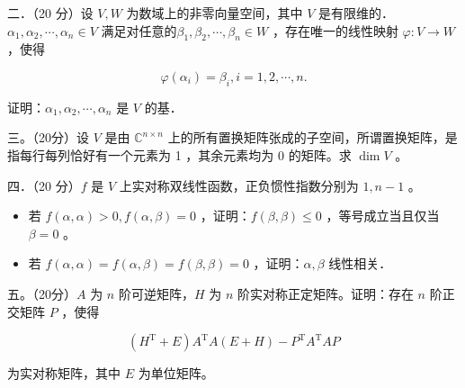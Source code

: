 \documentclass{article}
\begin{document}
二．（20 分）设 \(V, W\) 为数域上的非零向量空间，其中 \(V\) 是有限维的．\(\alpha_{1}, \alpha_{2}, \cdots, \alpha_{n} \in V\) 满足对任意的\(\beta_{1}, \beta_{2}, \cdots, \beta_{n} \in W\) ，存在唯一的线性映射 \(\varphi: V \rightarrow W\) ，使得

\[
\varphi\left(\alpha_{i}\right)=\beta_{i}, i=1,2, \cdots, n .
\]

证明：\(\alpha_{1}, \alpha_{2}, \cdots, \alpha_{n}\) 是 \(V\) 的基．

三。（20分）设 \(V\) 是由 \(\mathbb{C}^{n \times n}\) 上的所有置换矩阵张成的子空间，所谓置换矩阵，是指每行每列恰好有一个元素为 1 ，其余元素均为 0 的矩阵。求 \(\operatorname{dim} V\) 。

四．（20 分）\(f\) 是 \(V\) 上实对称双线性函数，正负惯性指数分别为 \(1, n-1\) 。

\begin{itemize}
  \item[（1）] 若 \(f(\alpha, \alpha)>0, f(\alpha, \beta)=0\) ，证明：\(f(\beta, \beta) \leq 0\) ，等号成立当且仅当 \(\beta=0\) 。
  \item[（2）] 若 \(f(\alpha, \alpha)=f(\alpha, \beta)=f(\beta, \beta)=0\) ，证明：\(\alpha, \beta\) 线性相关．
\end{itemize}

五。（20分）\(A\) 为 \(n\) 阶可逆矩阵，\(H\) 为 \(n\) 阶实对称正定矩阵。证明：存在 \(n\) 阶正交矩阵 \(P\) ，使得

\[
\left(H^{\mathrm{T}}+E\right) A^{\mathrm{T}} A(E+H)-P^{\mathrm{T}} A^{\mathrm{T}} A P
\]

为实对称矩阵，其中 \(E\) 为单位矩阵。
\end{document}
